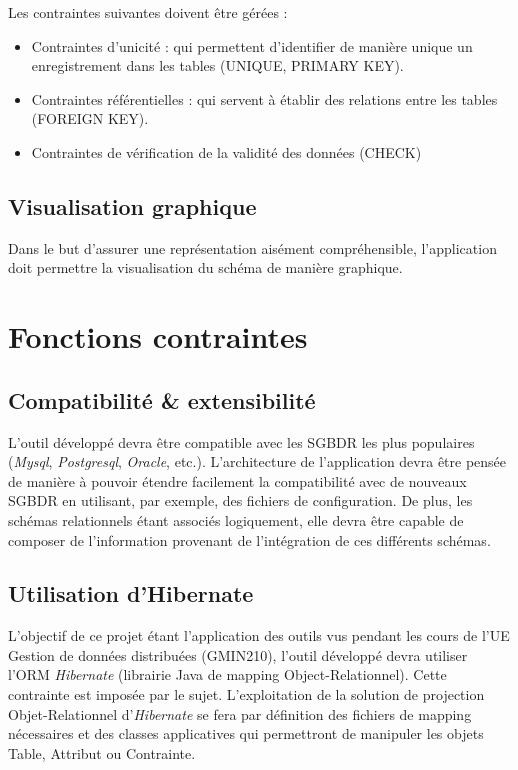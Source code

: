 				Les contraintes suivantes doivent être gérées : 
				
				\begin{itemize}
				\item Contraintes d'unicité : qui permettent d'identifier de manière unique un enregistrement dans les tables (UNIQUE, PRIMARY KEY).
				\item Contraintes référentielles : qui servent à établir des relations entre les tables (FOREIGN KEY).
				\item Contraintes de vérification de la validité des données (CHECK)
				\end{itemize}
				
		\subsection{Visualisation graphique}
		Dans le but d'assurer une représentation aisément compréhensible, l'application doit permettre la visualisation du schéma de manière graphique.

\section{Fonctions contraintes}
	\subsection{Compatibilité \& extensibilité}
	L'outil développé devra être compatible avec les SGBDR les plus populaires (\emph{Mysql}, \emph{Postgresql}, \emph{Oracle}, etc.). L'architecture de l'application devra être pensée de manière à pouvoir étendre facilement la compatibilité avec de nouveaux SGBDR en utilisant, par exemple, des fichiers de configuration. De plus, les schémas relationnels étant associés logiquement, elle devra être capable de composer de l’information provenant de l’intégration de ces différents schémas.
	\subsection{Utilisation d'Hibernate}
	L'objectif de ce projet étant l'application des outils vus pendant les cours de l'UE Gestion de données distribuées (GMIN210), l'outil développé devra utiliser l'ORM \emph{Hibernate} (librairie Java de mapping Object-Relationnel). Cette contrainte est imposée par le sujet. L'exploitation de la solution de projection Objet-Relationnel d'\emph{Hibernate} se fera par définition des fichiers de mapping nécessaires et des classes applicatives qui permettront de manipuler les objets Table, Attribut ou Contrainte.
